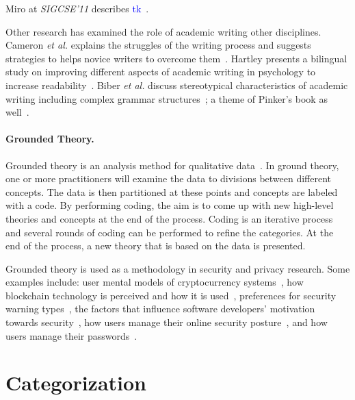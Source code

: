 \documentclass[sigconf,anonymous]{acmart}
\newcommand{\etal}{\textit{et al.}\xspace}
\newcommand{\textblue}[1]{\textcolor{blue}{#1}}
\begin{document}
Miro at \textit{SIGCSE'11} describes \textblue{tk}~\cite{Mir11}.

Other research has examined the role of academic writing other disciplines. Cameron \etal explains the struggles of the writing process and suggests strategies to helps novice writers to overcome them~\cite{cameron2009demystifying}. Hartley presents a bilingual study on improving different aspects of academic writing in psychology to increase readability~\cite{hartley2012new}. Biber \etal discuss stereotypical characteristics of academic writing including complex grammar structures~\cite{biber2010challenging}; a theme of Pinker's book as well~\cite{Pin15}.

	\paragraph{Grounded Theory.}

	Grounded theory is an analysis method for qualitative data~\cite{glaser1968discovery}. In ground theory, one or more practitioners will examine the data to divisions between different concepts. The data is then partitioned at these points and concepts are labeled with a code. By performing coding, the aim is to come up with new high-level theories and concepts at the end of the process. Coding is an iterative process and several rounds of coding can be performed to refine the categories. At the end of the process, a new theory that is based on the data is presented.

	Grounded theory is used as a methodology in security and privacy research. Some examples include: user mental models of cryptocurrency systems~\cite{mai2020user}, how blockchain technology is perceived and how it is used~\cite{ruoti2019blockchain}, preferences for security warning types~\cite{danilova2020one}, the factors that influence software developers' motivation towards security~\cite{assal2018motivations},  how users manage their online security posture~\cite{ruoti2017weighing}, and how users manage their passwords~\cite{stobert2014password}.

	\section{Categorization}
\end{document}
